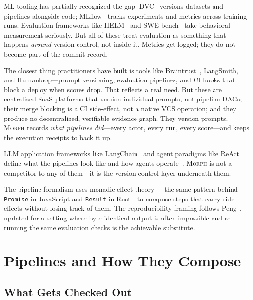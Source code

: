 \documentclass{article}
\begin{document}
ML tooling has partially recognized the gap. DVC~\citep{dvc2020} versions
datasets and pipelines alongside code; MLflow~\citep{zaharia2018mlflow} tracks
experiments and metrics across training runs. Evaluation frameworks like
HELM~\citep{liang2023helm} and SWE-bench~\citep{jimenez2024swebench} take
behavioral measurement seriously. But all of these treat evaluation as something
that happens \emph{around} version control, not inside it. Metrics get logged;
they do not become part of the commit record.

The closest thing practitioners have built is tools like Braintrust~\citep{braintrust2024},
LangSmith, and Humanloop---prompt versioning, evaluation pipelines, and CI hooks
that block a deploy when scores drop. That reflects a real need. But these are
centralized SaaS platforms that version individual prompts, not pipeline DAGs;
their merge blocking is a CI side-effect, not a native VCS operation; and they
produce no decentralized, verifiable evidence graph. They version prompts.
\textsc{Morph} records \emph{what pipelines did}---every actor, every run,
every score---and keeps the execution receipts to back it up.

LLM application frameworks like LangChain~\citep{chase2022langchain} and agent
paradigms like ReAct~\citep{yao2023react} define what the pipelines look like
and how agents operate~\citep{wang2024survey}. \textsc{Morph} is not a
competitor to any of them---it is the version control layer underneath them.

The pipeline formalism uses monadic effect theory~\citep{moggi1991notions,
wadler1995monads}---the same pattern behind \texttt{Promise} in JavaScript
and \texttt{Result} in Rust---to compose steps that carry side effects
without losing track of them. The reproducibility framing follows
Peng~\citep{peng2011reproducible}, updated for a setting where byte-identical
output is often impossible and re-running the same evaluation checks is the
achievable substitute.

\section{Pipelines and How They Compose}
\label{sec:programs}

\subsection{What Gets Checked Out}
\end{document}
